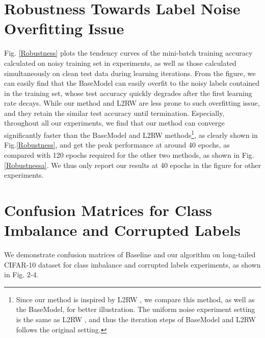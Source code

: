 \documentclass{article}
\begin{document}
	\section{Robustness Towards Label Noise Overfitting Issue}
Fig. \ref{Robustness} plots the tendency curves of the mini-batch training accuracy calculated on noisy training set in experiments, as well as those calculated simultaneously on clean test data during learning iterations. From the figure, we can easily find that the BaseModel can easily overfit to the noisy labels contained in the training set, whose test accuracy quickly degrades after the first learning rate decays. While our method and L2RW are less prone to such overfitting issue, and they retain the similar test accuracy until termination. Especially, throughout all our experiments, we find that our method can converge significantly faster than the BaseModel and L2RW methods\footnote{Since our method is inspired by L2RW \cite{ren2018learning}, we compare this method, as well as the BaseModel, for better illustration. The uniform noise experiment setting is the same as L2RW \cite{ren2018learning}, and thus the iteration steps of BaseModel and L2RW follows the original setting.}, as clearly shown in Fig.\ref{Robustness}, and get the peak performance at around 40 epochs, as compared with 120 epochs required for the other two methods, as shown in Fig. \ref{Robustnessa}. We thus only report our results at 40 epochs in the figure for other experiments.
	
	
	
	
	
	
	
	
	
	
	
	
	\newpage
	
	
	
	\section{Confusion Matrices for Class Imbalance and Corrupted Labels}
	We demonstrate confusion matrices of Baseline and our algorithm on long-tailed CIFAR-10 dataset for class imbalance and corrupted labels experiments, as shown in Fig. 2-4.
	
\end{document}
